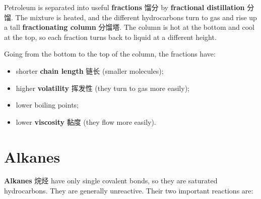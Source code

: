 \documentclass[11pt]{article}
\begin{document}
Petroleum is separated into useful \textbf{fractions} 馏分 by \textbf{fractional distillation} 分馏. The mixture is heated, and the different hydrocarbons turn to gas and rise up a tall \textbf{fractionating column} 分馏塔. The column is hot at the bottom and cool at the top, so each fraction turns back to liquid at a different height.

Going from the bottom to the top of the column, the fractions have:

\begin{itemize}
\item shorter \textbf{chain length} 链长 (smaller molecules);

\item higher \textbf{volatility} 挥发性 (they turn to gas more easily);

\item lower boiling points;

\item lower \textbf{viscosity} 黏度 (they flow more easily).

\end{itemize}

\begin{center}
\end{center}

\section*{Alkanes}

\textbf{Alkanes} 烷烃 have only single covalent bonds, so they are saturated hydrocarbons. They are generally unreactive. Their two important reactions are:
\end{document}
